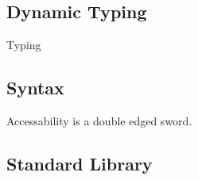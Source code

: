 		\iffalse
			Using foreign packkages people who don't know.

			operations reputational
			The distinction between interpreted and compiled becomes important when 
			Managing risk with compiled languages within the enterprise is accomplished by segregating the 
			The addition of an interpreter and run time ...
			Every environment is arguably a development environment ...

			distinction
			Compiled languages are comparatively easy to secure.
			The distinction between interpreted and compiled becomes 
			All languages share certain risks.
			The use of any languages brings risk. 
		\fi
			
	\subsection{Dynamic Typing}

		Typing

	\subsection{Syntax}

		Accessability is a double edged sword.

	\subsection{Standard Library}








